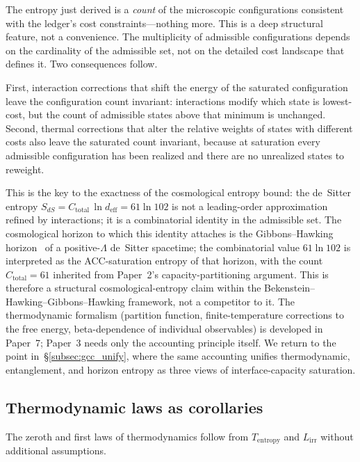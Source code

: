 \documentclass[11pt]{article}
\begin{document}
The entropy just derived is a \emph{count} of the microscopic configurations
consistent with the ledger's cost constraints---nothing more.  This is a
deep structural feature, not a convenience.  The multiplicity of admissible
configurations depends on the cardinality of the admissible set, not on the
detailed cost landscape that defines it.  Two consequences follow.

First, interaction corrections that shift the energy of the saturated
configuration leave the configuration count invariant: interactions modify
which state is lowest-cost, but the count of admissible states above that
minimum is unchanged.  Second, thermal corrections that alter the relative
weights of states with different costs also leave the saturated count
invariant, because at saturation every admissible configuration has been
realized and there are no unrealized states to reweight.

This is the key to the exactness of the cosmological entropy bound: the
de~Sitter entropy $S_{dS} = C_{\mathrm{total}}\,\ln d_{\mathrm{eff}}
= 61\ln 102$ is not a leading-order approximation refined by interactions;
it is a combinatorial identity in the admissible set.  The cosmological
horizon to which this identity attaches is the Gibbons--Hawking
horizon~\cite{GibbonsHawking1977} of a positive-$\Lambda$ de~Sitter
spacetime; the combinatorial value $61\ln 102$ is interpreted as the
ACC-saturation entropy of that horizon, with the count $C_{\mathrm{total}} = 61$
inherited from Paper~2's capacity-partitioning argument.  This is therefore
a structural cosmological-entropy claim within the
Bekenstein--Hawking--Gibbons--Hawking framework, not a competitor to it.  The thermodynamic
formalism (partition function, finite-temperature corrections to the
free energy, beta-dependence of individual observables) is developed in
Paper~7; Paper~3 needs only the accounting principle itself.  We return to
the point in~\S\ref{subsec:gcc_unify}, where the same accounting unifies
thermodynamic, entanglement, and horizon entropy as three views of
interface-capacity saturation.

\subsection{Thermodynamic laws as corollaries}

The zeroth and first laws of thermodynamics follow from $T_{\mathrm{entropy}}$
and $L_{\mathrm{irr}}$ without additional assumptions.
\end{document}
